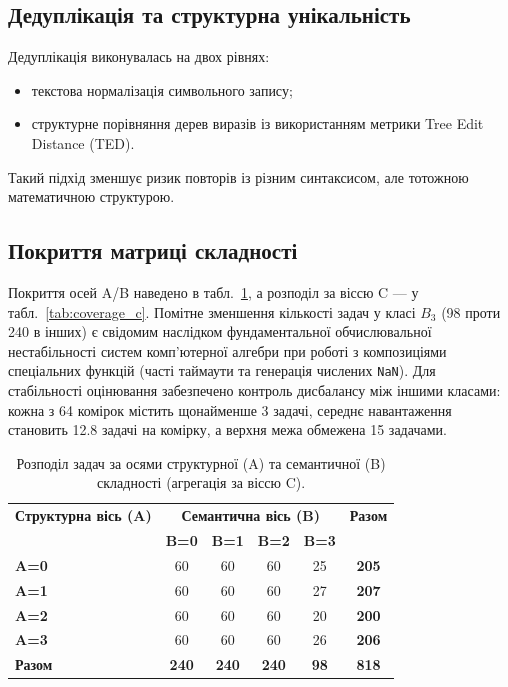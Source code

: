 \documentclass[11pt]{article}
\begin{document}
\subsection{Дедуплікація та структурна унікальність}

Дедуплікація виконувалась на двох рівнях:
\begin{itemize}[leftmargin=1.5em]
  \item текстова нормалізація символьного запису;
  \item структурне порівняння дерев виразів із використанням метрики Tree Edit Distance (TED).
\end{itemize}

Такий підхід зменшує ризик повторів із різним синтаксисом, але тотожною математичною структурою.

\subsection{Покриття матриці складності}

Покриття осей A/B наведено в табл.~\ref{tab:coverage_ab}, а розподіл за віссю C --- у табл.~\ref{tab:coverage_c}. Помітне зменшення кількості задач у класі $B_3$ (98 проти 240 в інших) є свідомим наслідком фундаментальної обчислювальної нестабільності систем комп'ютерної алгебри при роботі з композиціями спеціальних функцій (часті таймаути та генерація числених \texttt{NaN}). Для стабільності оцінювання забезпечено контроль дисбалансу між іншими класами: кожна з 64 комірок містить щонайменше 3 задачі, середнє навантаження становить 12.8 задачі на комірку, а верхня межа обмежена 15 задачами.

\begin{table}[h]
\centering
\begin{tabular}{l|cccc|c}
\toprule
\textbf{Структурна вісь (A)} & \multicolumn{4}{c|}{\textbf{Семантична вісь (B)}} & \textbf{Разом} \\
 & \textbf{B=0} & \textbf{B=1} & \textbf{B=2} & \textbf{B=3} & \\
\midrule
\textbf{A=0} & 60 & 60 & 60 & 25 & \textbf{205} \\
\textbf{A=1} & 60 & 60 & 60 & 27 & \textbf{207} \\
\textbf{A=2} & 60 & 60 & 60 & 20 & \textbf{200} \\
\textbf{A=3} & 60 & 60 & 60 & 26 & \textbf{206} \\
\midrule
\textbf{Разом} & \textbf{240} & \textbf{240} & \textbf{240} & \textbf{98} & \textbf{818} \\
\bottomrule
\end{tabular}
\caption{Розподіл задач за осями структурної (A) та семантичної (B) складності (агрегація за віссю C).}
\label{tab:coverage_ab}
\end{table}
\end{document}
